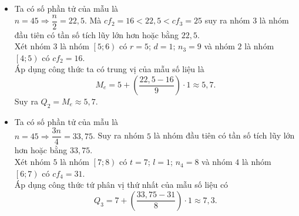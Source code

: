 \begin{ex}
{\begin{itemize}
			$n=45\Rightarrow \dfrac{n}{4}=11{,}25$.\\ 
			Suy ra nhóm $2$ là nhóm đầu tiên có tần số tích lũy lớn  hơn hoặc bằng $11{,}25$.\\
			Xét nhóm $2$ là nhóm $\left[4; 5\right)$ có $s=4$; $h=1$; $n_2=11$ và nhóm $1$ là nhóm $\left[3; 4\right)$ có  $cf_1=5$.\\
			Áp dụng  công thức tứ phân vị thứ nhất của mẫu số liệu có
			 \[Q_1=4+\left(\dfrac{11,25-5}{11} \right)\cdot 1\approx 4{,}6.\]
			\item Ta có số phần  tử của mẫu là\\
			 $n=45\Rightarrow \dfrac{n}{2}=22{,}5$.
			Mà $cf_2=16< 22{,}5< cf_3=25$ suy ra nhóm $3$ là nhóm đầu tiên có tần  số tích lũy lớn hơn hoặc bằng $22{,}5$.\\
			Xét nhóm $3$ là nhóm $\left[5; 6\right)$ có $r=5$; $d=1$; $n_3=9$ và nhóm $2$ là nhóm $\left[4;  5\right)$ có $cf_2=16$.\\
			Áp dụng công thức ta có trung  vị của mẫu số liệu là
			\[M_e=5+\left(\dfrac{22{,}5-16}{9} \right)\cdot  1\approx 5{,}7.\]
			Suy ra $Q_2=M_e  \approx 5{,}7$.
			\item Ta có số phần tử của mẫu  là\\
			 $n=45\Rightarrow \dfrac{3n}{4}=33{,}75$.
			Suy ra nhóm $5$ là nhóm đầu tiên có tần số tích lũy lớn hơn hoặc bằng $33{,}75$.\\ 
			Xét nhóm $5$ là nhóm $\left[7; 8\right)$ có $t=7$; $l=1$; $n_4=8$ và nhóm $4$ là  nhóm $\left[6; 7\right)$ có $cf_4=31$.\\
			Áp dụng công thức tứ phân vị  thứ nhất của mẫu số liệu có
			 \[Q_3=7+\left(\dfrac{33{,}75-31}{8} \right)\cdot 1\approx 7{,}3.\]
		\end{itemize}
	} 
\end{ex}

